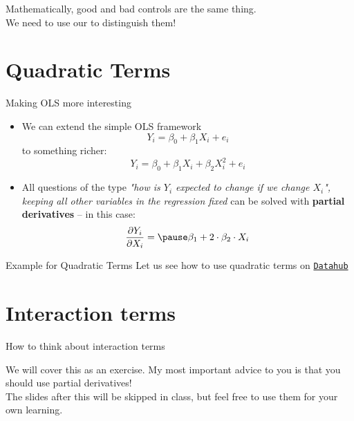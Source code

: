 \documentclass[11pt]{beamer}
\begin{document}
{
\begin{frame}[standout]
    \centering
  Mathematically, good and bad controls are the same thing. \\ 
  We need to use our  to distinguish them!
\end{frame}
}




\section{Quadratic Terms}




\begin{frame}{Making OLS more interesting}
    \begin{itemize}
        \item We can extend the simple OLS framework
        $$ Y_i = \beta_0 + \beta_1 X_i + e_i $$
        to something richer:
        $$ Y_i = \beta_0 + \beta_1 X_i + \beta_2 X_i^2 + e_i $$
        \item All questions of the type \textit{"how is $Y_i$ expected to change if we change $X_i$", keeping all other variables in the regression fixed} can be solved with \textbf{partial derivatives} -- in this case:
         $$ \frac{\partial Y_i}{\partial X_i} = \pause \beta_1 + 2 \cdot \beta_2 \cdot X_i $$
    \end{itemize}
\end{frame}






\begin{frame}{Example for Quadratic Terms}
Let us see how to use quadratic terms on
\texttt{\alert{\href{https://datahub.berkeley.edu/user/jonathan_old/lab/tree/ECON-140-FA24-RDE/Sections/Jonathan/Section\%204\%20-\%20OVB\%20and\%20quadratic\%20terms.ipynb}{Datahub}}}

\end{frame}





\section{Interaction terms }

\begin{frame}{How to think about interaction terms}

We will cover this as an exercise. My most important advice to you is that you should use partial derivatives! \\ 


The slides after this will be skipped in class, but feel free to use them for your own learning.

\end{frame}
\end{document}
